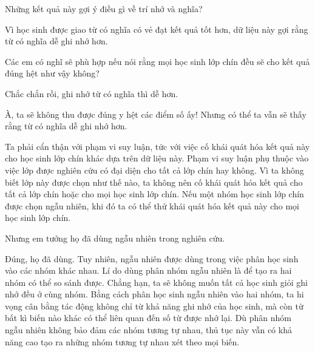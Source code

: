 {\begin{scriptlist}
      \item [Giáo viên:] Những kết quả này gợi ý điều gì về trí nhớ và nghĩa?

      \item [Học sinh N:] Vì học sinh được giao từ có nghĩa có vẻ đạt kết quả tốt hơn, dữ liệu này gợi rằng từ có nghĩa dễ ghi nhớ hơn.\vspace{\baselineskip}

      \item [Giáo viên:] Các em có nghĩ sẽ phù hợp nếu nói rằng mọi học sinh lớp chín đều sẽ cho kết quả đúng hệt như vậy không?

      \item [Học sinh O:] Chắc chắn rồi, ghi nhớ từ có nghĩa thì dễ hơn.

      \item [Học sinh P:] À, ta sẽ không thu được đúng y hệt các điểm số ấy! Nhưng có thể ta vẫn sẽ thấy rằng từ có nghĩa dễ ghi nhớ hơn.

      \item [Giáo viên:] Ta phải cẩn thận với phạm vi suy luận, tức với việc cố khái quát hóa kết quả này cho học sinh lớp chín khác dựa trên dữ liệu này. Phạm vi suy luận phụ thuộc vào việc lớp được nghiên cứu có đại diện cho tất cả lớp chín hay không. Vì ta không biết lớp này được chọn như thế nào, ta không nên cố khái quát hóa kết quả cho tất cả lớp chín hoặc cho mọi học sinh lớp chín. Nếu một nhóm học sinh lớp chín được chọn ngẫu nhiên, khi đó ta có thể thử khái quát hóa kết quả này cho mọi học sinh lớp chín.\vspace{\baselineskip}

      \item [Học sinh Q:] Nhưng em tưởng họ đã dùng ngẫu nhiên trong nghiên cứu.

      \item [Giáo viên:] Đúng, họ đã dùng. Tuy nhiên, ngẫu nhiên được dùng trong việc phân học sinh vào các nhóm khác nhau. Lí do dùng phân nhóm ngẫu nhiên là để tạo ra hai nhóm có thể so sánh được. Chẳng hạn, ta sẽ không muốn tất cả học sinh giỏi ghi nhớ đều ở cùng nhóm. Bằng cách phân học sinh ngẫu nhiên vào hai nhóm, ta hi vọng cân bằng tác động không chỉ từ khả năng ghi nhớ của học sinh, mà còn từ bất kì biến nào khác có thể liên quan đến số từ được nhớ lại. Dù phân nhóm ngẫu nhiên không bảo đảm các nhóm tương tự nhau, thủ tục này vẫn có khả năng cao tạo ra những nhóm tương tự nhau xét theo mọi biến.
    \end{scriptlist}\vspace{2\baselineskip}

}
